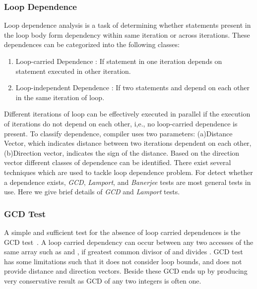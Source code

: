 \subsubsection{Loop Dependence}
Loop dependence analysis is a task of determining whether statements present in the 
loop body form dependency within same iteration or across iterations. These
dependences can be categorized into the following classes: 
\begin{enumerate}
\item Loop-carried Dependence : If statement  in one iteration 
depends on statement 
 executed in other iteration. 

\item Loop-independent Dependence : If two statements  and  
depend on each other in the same iteration of loop. 
\end{enumerate}
Different iterations of loop can be effectively executed in parallel if the 
execution of iterations do not depend on each other, i,e., no loop-carried 
dependence is present. To classify dependence, compiler uses two parameters: 
(a)Distance Vector, which indicates distance between two iterations dependent on each other, (b)Direction vector, indicates the sign of the distance. Based on the direction vector different classes of dependence can be identified. There exist several techniques which are used to tackle loop dependence problem. For 
detect whether a dependence exists, \emph{GCD}, \emph{Lamport}, and 
\emph{Banerjee} tests are most general tests in use. Here we give brief details of \emph{GCD} and \emph{Lamport} tests. 
%
\subsubsection*{GCD Test}
A simple and sufficient test for the absence of loop carried 
dependences is the GCD test~\cite{Kennedy01Optimizing}. 
A loop carried dependency can occur between any two accesses of the same array  
such as  and , if greatest common divisor of 
 and  divides . GCD test has some limitations 
such that it does not consider loop bounds, and does not provide distance and 
direction vectors. Beside these GCD ends up by producing very conservative result as GCD 
of any two integers is often one.
%
